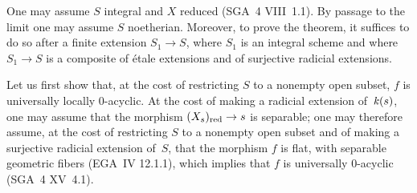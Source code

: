 One may assume $S$ integral and $X$ reduced (SGA~4
VIII~1.1). By passage to the limit one may assume $S$
noetherian. Moreover, to prove the theorem, it
suffices to do so after a finite extension $S_1\to S$, where $S_1$
is an integral scheme and where $S_1\to S$ is a composite
of \'etale extensions and of surjective radicial extensions.

Let us first show that, at the cost of restricting $S$ to a nonempty open
subset, $f$ is universally locally $0$-acyclic. At the cost of
making a radicial extension of~$\mathit{k}(s)$, one may assume that the
morphism $(X_s)_\red\to s$ is separable; one may therefore assume,
at the cost of restricting $S$ to a nonempty open subset and of making
a surjective radicial extension of~$S$, that the morphism $f$ is
flat, with separable geometric fibers (EGA~IV
12.1.1), which implies that $f$ is universally
$0$-acyclic (SGA~4 XV~4.1).


